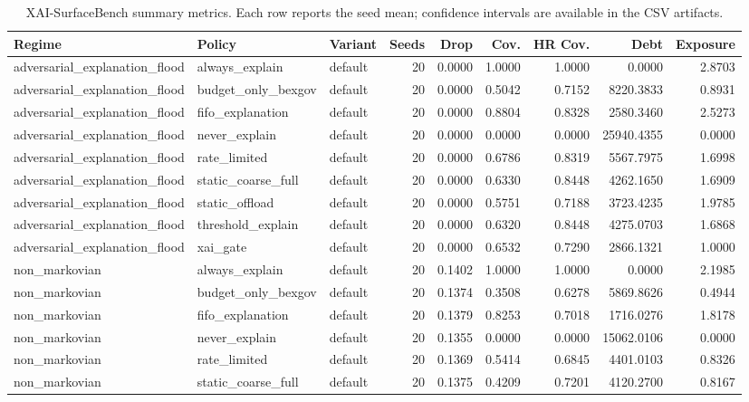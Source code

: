 \begin{table}[t]
\centering
\scriptsize
\caption{XAI-SurfaceBench summary metrics. Each row reports the seed mean; confidence intervals are available in the CSV artifacts.}
\begin{tabular}{lllrrrrrr}
\toprule
Regime & Policy & Variant & Seeds & Drop & Cov. & HR Cov. & Debt & Exposure \\
\midrule
adversarial\_explanation\_flood & always\_explain & default & 20 & 0.0000 & 1.0000 & 1.0000 & 0.0000 & 2.8703 \\
adversarial\_explanation\_flood & budget\_only\_bexgov & default & 20 & 0.0000 & 0.5042 & 0.7152 & 8220.3833 & 0.8931 \\
adversarial\_explanation\_flood & fifo\_explanation & default & 20 & 0.0000 & 0.8804 & 0.8328 & 2580.3460 & 2.5273 \\
adversarial\_explanation\_flood & never\_explain & default & 20 & 0.0000 & 0.0000 & 0.0000 & 25940.4355 & 0.0000 \\
adversarial\_explanation\_flood & rate\_limited & default & 20 & 0.0000 & 0.6786 & 0.8319 & 5567.7975 & 1.6998 \\
adversarial\_explanation\_flood & static\_coarse\_full & default & 20 & 0.0000 & 0.6330 & 0.8448 & 4262.1650 & 1.6909 \\
adversarial\_explanation\_flood & static\_offload & default & 20 & 0.0000 & 0.5751 & 0.7188 & 3723.4235 & 1.9785 \\
adversarial\_explanation\_flood & threshold\_explain & default & 20 & 0.0000 & 0.6320 & 0.8448 & 4275.0703 & 1.6868 \\
adversarial\_explanation\_flood & xai\_gate & default & 20 & 0.0000 & 0.6532 & 0.7290 & 2866.1321 & 1.0000 \\
non\_markovian & always\_explain & default & 20 & 0.1402 & 1.0000 & 1.0000 & 0.0000 & 2.1985 \\
non\_markovian & budget\_only\_bexgov & default & 20 & 0.1374 & 0.3508 & 0.6278 & 5869.8626 & 0.4944 \\
non\_markovian & fifo\_explanation & default & 20 & 0.1379 & 0.8253 & 0.7018 & 1716.0276 & 1.8178 \\
non\_markovian & never\_explain & default & 20 & 0.1355 & 0.0000 & 0.0000 & 15062.0106 & 0.0000 \\
non\_markovian & rate\_limited & default & 20 & 0.1369 & 0.5414 & 0.6845 & 4401.0103 & 0.8326 \\
non\_markovian & static\_coarse\_full & default & 20 & 0.1375 & 0.4209 & 0.7201 & 4120.2700 & 0.8167 \\

\end{tabular}
\end{table}
